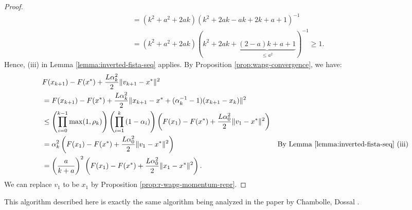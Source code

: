 \documentclass[12pt]{article}
\begin{document}
\begin{proof}
\begin{align*}
            &= (k^2 + a^2 + 2ak)(k^2 + 2ak - ak + 2k + a + 1)^{-1}
            \\
            &= (k^2 + a^2 + 2ak)(k^2 + 2ak + \underbrace{(2 - a)k + a + 1}_{\le a^2})^{-1} \ge 1. 
        \end{align*}
        Hence, (iii) in Lemma \ref{lemma:inverted-fista-seq} applies. 
        By Proposition \ref{prop:wapg-convergence}, we have:
        {\small\begin{align*}
            & F(x_{k + 1}) - F(x^*) + \frac{L\alpha_k^2}{2}\Vert v_{k + 1} - x^*\Vert^2
            \\
            & = F(x_{k + 1}) - F(x^*) + \frac{L\alpha_k^2}{2}\Vert x_{k + 1} - x^* + (\alpha_k^{-1} - 1)(x_{k + 1} - x_k)\Vert^2
            \\
            & \le 
            \left(
                \prod_{i = 0}^{k - 1} \max(1, \rho_{k})
            \right)
            \left(
                \prod_{i = 1}^{k} \left(1  - \alpha_i\right)
            \right)
            \left(
                F(x_1) - F(x^*) + \frac{L\alpha_0^2}{2}\Vert v_1 - x^*\Vert^2
            \right)
            \\
            &= 
            \alpha_k^2
            \left(
                F(x_1) - F(x^*) + \frac{L\alpha_0^2}{2}\Vert v_1 - x^*\Vert^2
            \right) 
            & \text{By Lemma \ref{lemma:inverted-fista-seq} (iii)}
            \\
            &= 
            \left(\frac{a}{k + a}\right)^2
            \left(
                F(x_1) - F(x^*) + \frac{L\alpha_0^2}{2}\Vert x_1 - x^*\Vert^2
            \right). 
        \end{align*}}
        We can replace $v_1$ to be $x_1$ by Proposition \ref{prop:r-wapg-momentum-repr}. 
    \end{proof}
    \begin{remark}
        This algorithm described here is exactly the same algorithm being analyzed in the paper by Chambolle, Dossal \cite{chambolle_convergence_2015}. 
    \end{remark}
\end{document}
